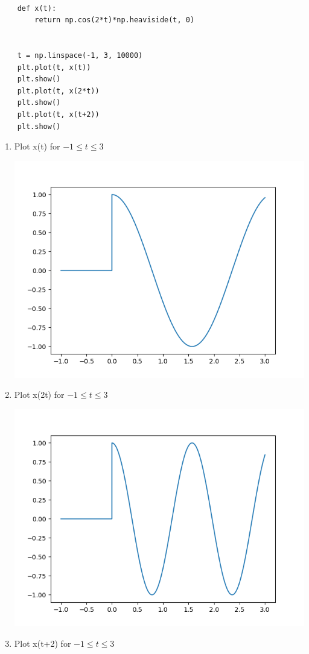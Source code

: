 \documentclass{article}
\begin{document}
\begin{enumerate}
\begin{lstlisting}
    
    def x(t):
        return np.cos(2*t)*np.heaviside(t, 0)
    
    
    t = np.linspace(-1, 3, 10000)
    plt.plot(t, x(t))
    plt.show()
    plt.plot(t, x(2*t))
    plt.show()
    plt.plot(t, x(t+2))
    plt.show()
    \end{lstlisting}
    \begin{multicols*}{2}
    \begin{enumerate}
        \item Plot x(t) for $-1 \leq t \leq 3$
        
        \includegraphics[width = .41\textwidth]{7a.png}
        \item Plot x(2t) for $-1 \leq t \leq 3$
        
        \includegraphics[width = .41\textwidth]{7b.png}
        \item Plot x(t+2) for $-1 \leq t \leq 3$
        

\end{enumerate}
\end{multicols*}
\end{enumerate}
\end{document}
